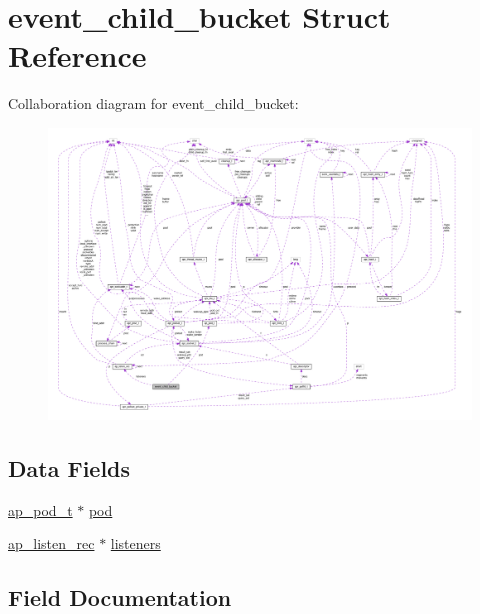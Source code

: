 \hypertarget{structevent__child__bucket}{}\section{event\+\_\+child\+\_\+bucket Struct Reference}
\label{structevent__child__bucket}


Collaboration diagram for event\+\_\+child\+\_\+bucket\+:
\nopagebreak
\begin{figure}[H]
\begin{center}
\leavevmode
\includegraphics[width=350pt]{structevent__child__bucket__coll__graph}
\end{center}
\end{figure}
\subsection*{Data Fields}
\begin{DoxyCompactItemize}
\item 
\hyperlink{structap__pod__t}{ap\+\_\+pod\+\_\+t} $\ast$ \hyperlink{structevent__child__bucket_ab442f245214d6b844979949674946770}{pod}
\item 
\hyperlink{structap__listen__rec}{ap\+\_\+listen\+\_\+rec} $\ast$ \hyperlink{structevent__child__bucket_ab78166c7d3cbebb370aedf8951336654}{listeners}
\end{DoxyCompactItemize}


\subsection{Field Documentation}
